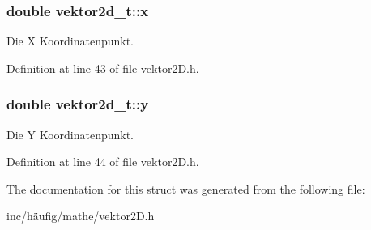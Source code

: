 \subsubsection[{\texorpdfstring{x}{x}}]{\setlength{\rightskip}{0pt plus 5cm}double vektor2d\+\_\+t\+::x}\hypertarget{structvektor2d__t_abc6c2378cebc6d70131fe5ca1ff94050}{}\label{structvektor2d__t_abc6c2378cebc6d70131fe5ca1ff94050}


Die X Koordinatenpunkt. 



Definition at line 43 of file vektor2\+D.\+h.

\subsubsection[{\texorpdfstring{y}{y}}]{\setlength{\rightskip}{0pt plus 5cm}double vektor2d\+\_\+t\+::y}\hypertarget{structvektor2d__t_a3c83744cd0477a439f4cd2385f702579}{}\label{structvektor2d__t_a3c83744cd0477a439f4cd2385f702579}


Die Y Koordinatenpunkt. 



Definition at line 44 of file vektor2\+D.\+h.



The documentation for this struct was generated from the following file\+:\begin{DoxyCompactItemize}
\item 
inc/häufig/mathe/vektor2\+D.\+h\end{DoxyCompactItemize}
